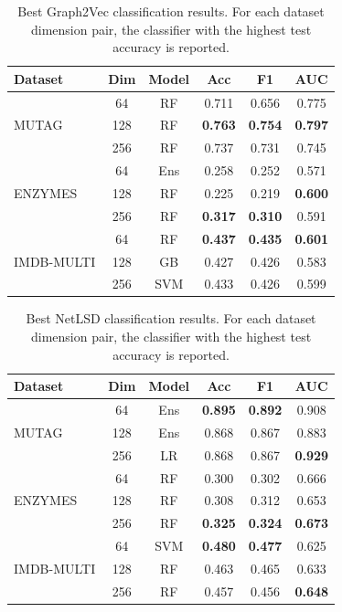\begin{table}
\centering
\begin{tabular}{l c c c c c}
\hline
\textbf{Dataset} & \textbf{Dim} & \textbf{Model} & \textbf{Acc} & \textbf{F1} & \textbf{AUC} \\
\hline
      & 64  & RF  & 0.711 & 0.656 & 0.775 \\
MUTAG      & 128 & RF  & \textbf{0.763} & \textbf{0.754} & \textbf{0.797} \\
     & 256 & RF  & 0.737 & 0.731 & 0.745 \\
\hline
    & 64  & Ens & 0.258 & 0.252 & 0.571 \\
ENZYMES    & 128 & RF  & 0.225 & 0.219 & \textbf{0.600} \\
   & 256 & RF  & \textbf{0.317} & \textbf{0.310} & 0.591 \\
\hline
 & 64  & RF  & \textbf{0.437} & \textbf{0.435} & \textbf{0.601} \\
IMDB-MULTI & 128 & GB  & 0.427 & 0.426 & 0.583 \\
 & 256 & SVM & 0.433 & 0.426 & 0.599 \\
\hline
\end{tabular}
\caption{Best Graph2Vec classification results. 
For each dataset dimension pair, the classifier with the highest test accuracy is reported.}
\label{tab:graph2vec_best}
\end{table}


\begin{table}
\centering
\begin{tabular}{l c c c c c}
\hline
\textbf{Dataset} & \textbf{Dim} & \textbf{Model} & \textbf{Acc} & \textbf{F1} & \textbf{AUC} \\
\hline
     & 64  & Ens & \textbf{0.895} & \textbf{0.892} & 0.908 \\
MUTAG      & 128 & Ens & 0.868 & 0.867 & 0.883 \\
     & 256 & LR  & 0.868 & 0.867 & \textbf{0.929} \\
\hline
   & 64  & RF  & 0.300 & 0.302 & 0.666 \\
ENZYMES    & 128 & RF  & 0.308 & 0.312 & 0.653 \\
    & 256 & RF  & \textbf{0.325} & \textbf{0.324} & \textbf{0.673} \\
\hline
 & 64  & SVM & \textbf{0.480} & \textbf{0.477} & 0.625 \\
IMDB-MULTI & 128 & RF  & 0.463 & 0.465 & 0.633 \\
 & 256 & RF  & 0.457 & 0.456 & \textbf{0.648} \\
\hline
\end{tabular}
\caption{Best NetLSD classification results.
For each dataset dimension pair, the classifier with the highest test accuracy is reported.}
\label{tab:netlsd_best}
\end{table}




